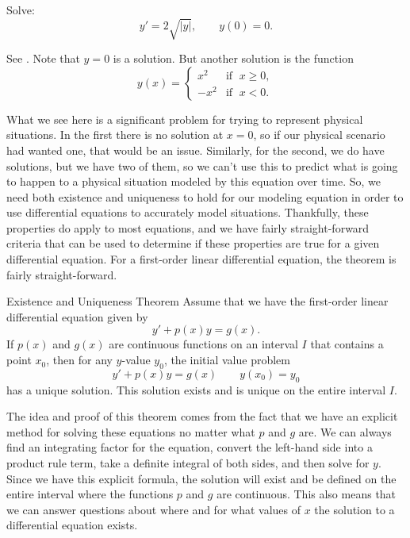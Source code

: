 \documentclass{ximera}
\begin{document}
\begin{example}\label{ex:nonuniqueness}
    Solve:
    \begin{equation*}
        y' = 2 \sqrt{\lvert y \rvert}, \qquad y(0) = 0 .
    \end{equation*}
    
    See . Note that $y=0$ is a solution.  But another solution is the function
    \begin{equation*}
        y(x) =
        \begin{cases}
            x^2 & \text{if } \; x \geq 0,\\
            -x^2 & \text{if } \; x < 0.
        \end{cases}
    \end{equation*}
\end{example}

What we see here is a significant problem for trying to represent physical situations. In the first there is no solution at $x=0$, so if our physical scenario had wanted one, that would be an issue. Similarly, for the second, we do have solutions, but we have two of them, so we can't use this to predict what is going to happen to a physical situation modeled by this equation over time. So, we need both existence and uniqueness to hold for our modeling equation in order to use differential equations to accurately model situations. Thankfully, these properties do apply to most equations, and we have fairly straight-forward criteria that can be used to determine if these properties are true for a given differential equation. For a first-order linear differential equation, the theorem is fairly straight-forward.

\begin{theorem}{}%
    Existence and Uniqueness Theorem Assume that we have the first-order linear differential equation given by
    \begin{equation*}
        y' + p(x)y = g(x).
    \end{equation*}
    If $p(x)$ and $g(x)$ are continuous functions on an interval $I$ that contains a point $x_0$, then for any $y$-value $y_0$, the initial value problem
    \begin{equation*}
        y' + p(x)y = g(x) \qquad y(x_0) = y_0
    \end{equation*}
    has a unique solution. This solution exists and is unique on the entire interval $I$.
\end{theorem}

The idea and proof of this theorem comes from the fact that we have an explicit method for solving these equations no matter what $p$ and $g$ are. We can always find an integrating factor for the equation, convert the left-hand side into a product rule term, take a definite integral of both sides, and then solve for $y$. Since we have this explicit formula, the solution will exist and be defined on the entire interval where the functions $p$ and $g$ are continuous. This also means that we can answer questions about where and for what values of $x$ the solution to a differential equation exists.
\end{document}
